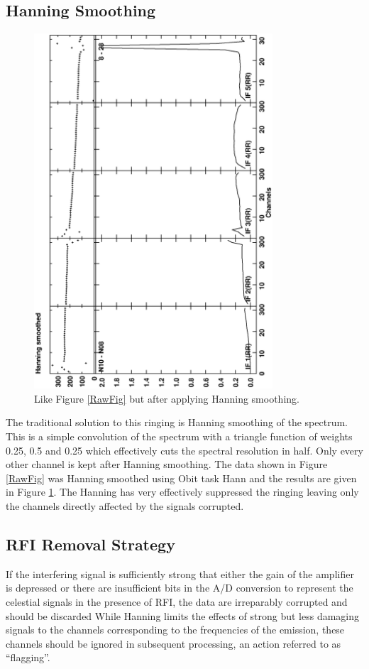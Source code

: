\documentclass[journal]{IEEEtran}
\begin{document}
\subsection{Hanning Smoothing}
\begin{figure}
\includegraphics[angle=-90,width=3.5in]{figs/HannSmo.eps}
\caption{ 
Like Figure \ref{RawFig} but after applying Hanning smoothing.
} 
\label{HannFig}
\end{figure}

The traditional solution to this ringing is Hanning smoothing of the
spectrum.
This is a simple convolution of the spectrum with a triangle function
of weights 0.25, 0.5 and 0.25 which effectively cuts the spectral
resolution in half.
Only every other channel is kept after Hanning smoothing.
The data shown in Figure  \ref{RawFig} was Hanning smoothed using Obit
task Hann and the results are given in Figure \ref{HannFig}.
The Hanning has very effectively suppressed the ringing leaving only
the channels directly affected by the signals corrupted.

\subsection{RFI Removal Strategy}
If the interfering signal is sufficiently strong that either the gain
of the amplifier is depressed or there are insufficient bits in the
A/D conversion to represent the celestial signals in the presence of
RFI, the data are irreparably corrupted and should be discarded
While Hanning limits the effects of strong but less damaging signals
to the channels corresponding to the frequencies of the emission,
these channels should be ignored in subsequent processing, an action
referred to as ``flagging''.
\end{document}
